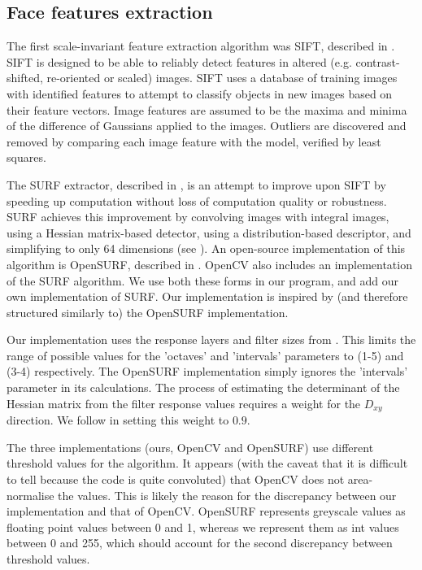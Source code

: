 \subsection{Face features extraction}
\label{sec:features}

The first scale-invariant feature extraction algorithm was SIFT, described in \cite{SIFT}. SIFT is designed to be able to reliably detect features in altered (e.g. contrast-shifted, re-oriented or scaled) images. SIFT uses a database of training images with identified features to attempt to classify objects in new images based on their feature vectors. Image features are assumed to be the maxima and minima of the difference of Gaussians applied to the images. Outliers are discovered and removed by comparing each image feature with the model, verified by least squares.

The SURF extractor, described in \cite{SURF}, is an attempt to improve upon SIFT by speeding up computation without loss of computation quality or robustness. SURF achieves this improvement by convolving images with integral images, using a Hessian matrix-based detector, using a distribution-based descriptor, and simplifying to only 64 dimensions (see \cite{SURF}). An open-source implementation of this algorithm is OpenSURF, described in \cite{OpenSURF}. OpenCV also includes an implementation of the SURF algorithm. We use both these forms in our program, and add our own implementation of SURF. Our implementation is inspired by (and therefore structured similarly to) the OpenSURF implementation.

Our implementation uses the response layers and filter sizes from \cite{SURF}. This limits the range of possible values for the 'octaves' and 'intervals' parameters to (1-5) and (3-4) respectively. The OpenSURF implementation simply ignores the 'intervals' parameter in its calculations. The process of estimating the determinant of the Hessian matrix from the filter response values requires a weight for the $D_{xy}$ direction. We follow \cite{SURF} in setting this weight to $0.9$.

The three implementations (ours, OpenCV and OpenSURF) use different threshold values for the algorithm. It appears (with the caveat that it is difficult to tell because the code is quite convoluted) that OpenCV does not area-normalise the values. This is likely the reason for the discrepancy between our implementation and that of OpenCV. OpenSURF represents greyscale values as floating point values between 0 and 1, whereas we represent them as int values between 0 and 255, which should account for the second discrepancy between threshold values.


